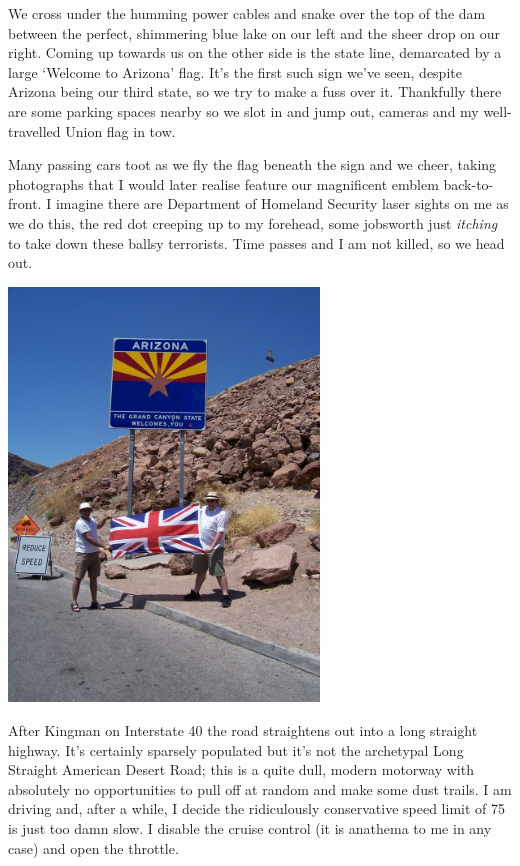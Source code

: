 \documentclass[a5paper,titlepage,11pt]{book}
\begin{document}
We cross under the humming power cables and snake over the top of the dam between the perfect, shimmering blue lake on our left and the sheer drop on our right. Coming up towards us on the other side is the state line, demarcated by a large `Welcome to Arizona' flag. It's the first such sign we've seen, despite Arizona being our third state, so we try to make a fuss over it. Thankfully there are some parking spaces nearby so we slot in and jump out, cameras and my well-travelled Union flag in tow.

Many passing cars toot as we fly the flag beneath the sign and we cheer, taking photographs that I would later realise feature our magnificent emblem back-to-front. I imagine there are Department of Homeland Security laser sights on me as we do this, the red dot creeping up to my forehead, some jobsworth just \emph{itching} to take down these ballsy terrorists. Time passes and I am not killed, so we head out.

\begin{center}\includegraphics[height=110mm]{gfx/100_1445}\end{center}

After Kingman on Interstate 40 the road straightens out into a long straight highway. It's certainly sparsely populated but it's not the archetypal Long Straight American Desert Road; this is a quite dull, modern motorway with absolutely no opportunities to pull off at random and make some dust trails. I am driving and, after a while, I decide the ridiculously conservative speed limit of 75 is just too damn slow. I disable the cruise control (it is anathema to me in any case) and open the throttle.
\end{document}
